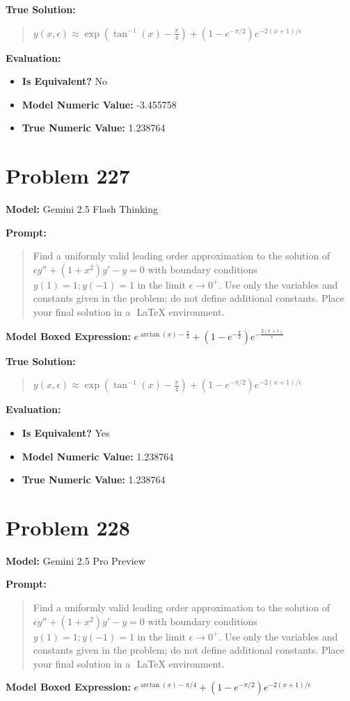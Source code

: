 \documentclass{article}
\begin{document}
{\textbf{True Solution:}
\begin{quote}
$y(x,\epsilon) \approx \exp\left(\tan^{-1}(x) - \frac{\pi}{4}\right) + \left(1 - e^{-\pi/2}\right) e^{- 2(x+1)/ \epsilon}$
\end{quote}

\textbf{Evaluation:}
\begin{itemize}
\item \textbf{Is Equivalent?} No
\item \textbf{Model Numeric Value:} -3.455758
\item \textbf{True Numeric Value:} 1.238764
\end{itemize}
\vspace{1cm}
\section*{Problem 227}
\textbf{Model:} Gemini 2.5 Flash Thinking

\textbf{Prompt:}
\begin{quote}
Find a uniformly valid leading order approximation to the solution of $\epsilon y'' + (1+x^2)y' - y = 0$ with boundary conditions $y(1) = 1; y(-1) = 1$ in the limit $\epsilon \to 0^+$. Use only the variables and constants given in the problem; do not define additional constants. Place your final solution in a $\boxed{}$ LaTeX environment.
\end{quote}
\textbf{Model Boxed Expression:} $e^{\arctan(x) - \frac{\pi}{4}} + (1-e^{-\frac{\pi}{2}})e^{-\frac{2(x+1)}{\epsilon}}$

\textbf{True Solution:}
\begin{quote}
$y(x,\epsilon) \approx \exp\left(\tan^{-1}(x) - \frac{\pi}{4}\right) + \left(1 - e^{-\pi/2}\right) e^{- 2(x+1)/ \epsilon}$
\end{quote}

\textbf{Evaluation:}
\begin{itemize}
\item \textbf{Is Equivalent?} Yes
\item \textbf{Model Numeric Value:} 1.238764
\item \textbf{True Numeric Value:} 1.238764
\end{itemize}
\vspace{1cm}
\section*{Problem 228}
\textbf{Model:} Gemini 2.5 Pro Preview

\textbf{Prompt:}
\begin{quote}
Find a uniformly valid leading order approximation to the solution of $\epsilon y'' + (1+x^2)y' - y = 0$ with boundary conditions $y(1) = 1; y(-1) = 1$ in the limit $\epsilon \to 0^+$. Use only the variables and constants given in the problem; do not define additional constants. Place your final solution in a $\boxed{}$ LaTeX environment.
\end{quote}
\textbf{Model Boxed Expression:} $e^{\arctan(x) - \pi/4} + (1 - e^{-\pi/2}) e^{-2(x+1)/\epsilon}$

}
\end{document}
